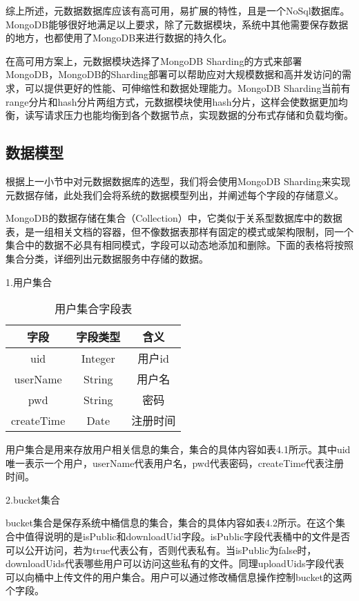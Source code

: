 综上所述，元数据数据库应该有高可用，易扩展的特性，且是一个NoSql数据库。MongoDB能够很好地满足以上要求，除了元数据模块，系统中其他需要保存数据的地方，也都使用了MongoDB来进行数据的持久化。

在高可用方案上，元数据模块选择了MongoDB Sharding的方式来部署MongoDB，MongoDB的Sharding部署可以帮助应对大规模数据和高并发访问的需求，可以提供更好的性能、可伸缩性和数据处理能力。MongoDB Sharding当前有range分片和hash分片两组方式，元数据模块使用hash分片，这样会使数据更加均衡，读写请求压力也能均衡到各个数据节点，实现数据的分布式存储和负载均衡。

\subsection{数据模型}
根据上一小节中对元数据数据库的选型，我们将会使用MongoDB Sharding来实现元数据存储，此处我们会将系统的数据模型列出，并阐述每个字段的存储意义。

MongoDB的数据存储在集合（Collection）中，它类似于关系型数据库中的数据表，是一组相关文档的容器，但不像数据表那样有固定的模式或架构限制，同一个集合中的数据不必具有相同模式，字段可以动态地添加和删除。下面的表格将按照集合分类，详细列出元数据服务中存储的数据。

1.用户集合

\begin{table}[h]
  \centering
  \vspace{10pt}
  \caption{用户集合字段表}
  \vspace{-15pt}
  \begin{tabular}{ccc}
    \toprule
    字段       & 字段类型  & 含义       \\
    \midrule
    uid        & Integer  & 用户id         \\
    userName   & String   & 用户名  \\
    pwd        & String   & 密码  \\
    createTime & Date     & 注册时间  \\
    \bottomrule
  \end{tabular}
\end{table}

用户集合是用来存放用户相关信息的集合，集合的具体内容如表4.1所示。其中uid唯一表示一个用户，userName代表用户名，pwd代表密码，createTime代表注册时间。

2.bucket集合

bucket集合是保存系统中桶信息的集合，集合的具体内容如表4.2所示。在这个集合中值得说明的是isPublic和downloadUid字段。isPublic字段代表桶中的文件是否可以公开访问，若为true代表公有，否则代表私有。当isPublic为false时，downloadUids代表哪些用户可以访问这些私有的文件。同理uploadUids字段代表可以向桶中上传文件的用户集合。用户可以通过修改桶信息操作控制bucket的这两个字段。

